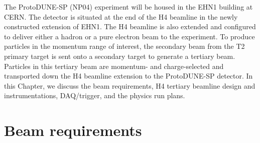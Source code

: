 The ProtoDUNE-SP (NP04) experiment will be housed in the EHN1 building at CERN. The detector is situated at the end of the H4 beamline in the newly constructed extension of EHN1. The H4 beamline is also extended and configured to deliver either a hadron or a pure electron beam to the experiment. To produce particles in the momentum range of interest, the secondary beam from the T2 primary target is sent onto a secondary target to generate a tertiary beam. Particles in this tertiary beam are momentum- and charge-selected and transported down the H4 beamline extension to the ProtoDUNE-SP detector. 
 In this Chapter, we discuss the beam requirements, H4 tertiary beamline design and instrumentations, DAQ/trigger, and the physics run plans.  

\section{Beam requirements}
\label{sec:beamrequirements}


